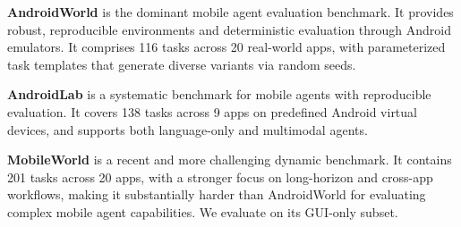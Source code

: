 \documentclass{article} %
\begin{document}
\textbf{AndroidWorld} \citep{rawles2024androidworld} is the dominant mobile agent evaluation benchmark.
It provides robust, reproducible environments and deterministic evaluation through Android emulators. It comprises 116 tasks across 20 real-world apps, with parameterized task templates that generate diverse variants via random seeds.

\textbf{AndroidLab} \citep{xu2025androidlab} is a systematic benchmark for mobile agents with reproducible evaluation. 
It covers 138 tasks across 9 apps on predefined Android virtual devices, and supports both language-only and multimodal agents.

\textbf{MobileWorld} \citep{kong2025mobileworld} is a recent and more challenging dynamic benchmark.
It contains 201 tasks across 20 apps, with a stronger focus on long-horizon and cross-app workflows, making it substantially harder than AndroidWorld for evaluating complex mobile agent capabilities.
We evaluate on its GUI-only subset.
\end{document}
